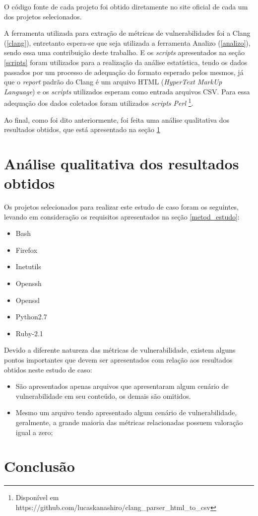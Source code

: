 O código fonte de cada projeto foi obtido diretamente no site oficial de cada um dos projetos selecionados.

A ferramenta utilizada para extração de métricas de vulnerabilidades foi a Clang (\ref{clang}), entretanto espera-se que seja 
utilizada a ferramenta Analizo (\ref{analizo}), sendo essa uma contribuição deste trabalho. E os \textit{scripts} apresentados 
na seção \ref{scripts} foram utilizados para a realização da análise estatística, tendo os dados passados por um processo de 
adequação do formato esperado pelos mesmos, já que o \textit{report} padrão do Clang é um arquivo HTML (\textit{HyperText MarkUp
Language}) e os \textit{scripts} utilizados esperam como entrada arquivos CSV. Para essa adequação dos dados coletados foram
utilizados \textit{scripts Perl} \footnote{Disponível em https://github.com/lucaskanashiro/clang\_parser\_html\_to\_csv}.

Ao final, como foi dito anteriormente, foi feita uma análise qualitativa dos resultados obtidos, que está apresentado na seção
\ref{analise_estudo}

\section{Análise qualitativa dos resultados obtidos} \label{analise_estudo}

Os projetos selecionados para realizar este estudo de caso foram os seguintes, levando em consideração os requisitos apresentados na
seção \ref{metod_estudo}:

\begin{itemize}
  \item Bash
  \item Firefox
  \item Inetutils
  \item Openssh
  \item Openssl
  \item Python2.7
  \item Ruby-2.1
\end{itemize}

Devido a diferente natureza das métricas de vulnerabilidade, existem alguns pontos importantes que devem ser apresentados com
relação aos resultados obtidos neste estudo de caso:

\begin{itemize}
  \item São apresentados apenas arquivos que apresentaram algum cenário de vulnerabilidade em seu conteúdo, os demais são
    omitidos.
  \item Mesmo um arquivo tendo apresentado algum cenário de vulnerabilidade, geralmente, a grande maioria das métricas 
    relacionadas possuem valoração igual a zero;
\end{itemize}

\section{Conclusão}

